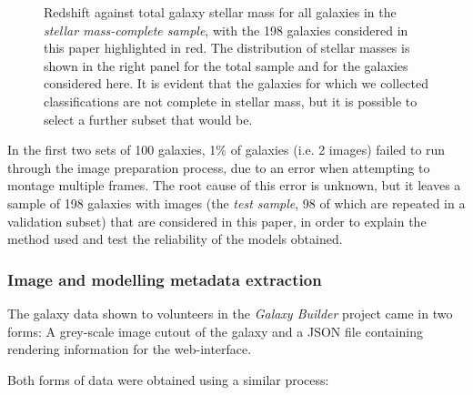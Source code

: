\documentclass[trackchanges]{aastex63}
\begin{document}
\begin{figure*}
  \caption{Redshift against total galaxy stellar mass for all galaxies in the \textit{stellar mass-complete sample}, with the 198 galaxies considered in this paper highlighted in red. The distribution of stellar masses is shown in the right panel for the total sample and for the galaxies considered here. It is evident that the galaxies for which we collected classifications are not complete in stellar mass, but it is possible to select a further subset that would be.}
  \label{fig:mass_redshift}
\end{figure*}

In the first two sets of 100 galaxies, 1\% of galaxies (i.e. 2 images) failed to run through the image preparation process, due to an error when attempting to montage multiple frames. The root cause of this error is unknown, but it leaves a sample of 198 galaxies with images (the \textit{test sample}, 98 of which are repeated in a validation subset) that are considered in this paper, in order to explain the method used and test the reliability of the models obtained.

\subsubsection{Image and modelling metadata extraction}
\label{sec:image_creation}

The galaxy data shown to volunteers in the \textit{Galaxy Builder} project came in two forms: A grey-scale image cutout of the galaxy and a JSON file containing rendering information for the web-interface.

Both forms of data were obtained using a similar process:
\end{document}
